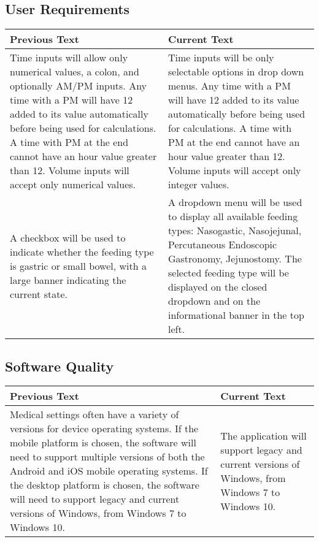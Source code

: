 \documentclass[fullpage,10pt, onecolumn, draftclsnofoot]{IEEEtran}
\begin{document}
\subsection{User Requirements}
\begin{tabular}{| p{} | p{} |}
\hline
Previous Text & Current Text \\
\hline
Time inputs will allow only numerical values, a colon, and optionally AM/PM inputs. Any time with a PM will
have 12 added to its value automatically before being used for calculations. A time with PM at the end cannot have an hour value greater than 12.
Volume inputs will accept only numerical values.
&
Time inputs will be only selectable options in drop down menus. Any time with a PM will
have 12 added to its value automatically before being used for calculations. A time with PM at the end cannot have an hour value greater than 12.
Volume inputs will accept only integer values.
\\ \hline
A checkbox will be used to indicate whether the feeding type is gastric or
small bowel, with a large banner indicating the current state.
&
A dropdown menu will be used to display all available feeding types: Nasogastic, Nasojejunal, Percutaneous Endoscopic Gastronomy, Jejunostomy.
The selected feeding type will be displayed on the closed dropdown and on the informational banner in the top left. 
\\
\hline
\end{tabular}
\subsection{Software Quality}
\begin{tabular}{| p{} | p{} |}
\hline
Previous Text & Current Text \\
\hline
Medical settings often
have a variety of versions for device operating systems.
If the mobile platform is chosen, the software will need to support 
multiple versions of both the Android and iOS mobile operating systems. If the desktop platform is chosen, the software will need
to support legacy and current versions of Windows, from Windows 7 to Windows 10.
&
The application will support legacy and current versions of Windows, from Windows 7 to Windows 10.
\\ \hline
\end{tabular}
\end{document}
